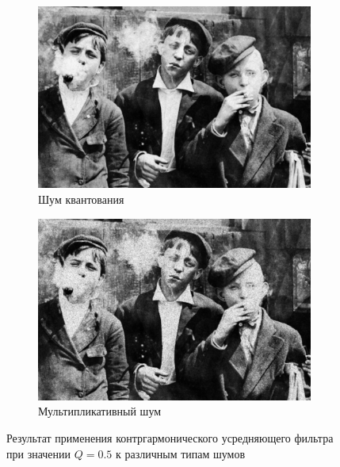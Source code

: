 \begin{figure}[ht!]
\begin{subfigure}[b]{0.5\linewidth}
      \includegraphics[width=0.95\linewidth]{../Contraharmonic_Filter/Contraharmonic_Poisson_noise_(m,n=(3,_3),q=0.5).jpg} 
      \caption{Шум квантования} 
      \label{contraharmonic_0.5:e}
    \end{subfigure}%
    \begin{subfigure}[b]{0.5\linewidth}
        \centering
        \includegraphics[width=0.95\linewidth]{../Contraharmonic_Filter/Contraharmonic_Speckle_noise_(m,n=(3,_3),q=0.5).jpg} 

        \caption{Мультипликативный шум} 
        \label{contraharmonic_0.5:f} 
    \end{subfigure} 
    \caption{Результат применения контргармонического усредняющего фильтра при значении $Q = 0.5$ к различным типам шумов}
    \label{img:contraharmonic_0.5} 
  \end{figure}

